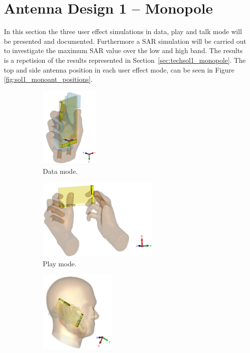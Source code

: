 \section{Antenna Design 1 -- Monopole}
In this section the three user effect simulations in data, play and talk mode will be presented and documented. Furthermore a SAR simulation will be carried out to investigate the maximum SAR value over the low and high band. The results is a repetision of the results represented in Section~\ref{sec:techsol1_monopole}.    
The top and side antenna position in each user effect mode, can be seen in Figure \ref{fig:sol1_monoant_positions}.


\begin{figure}[htbp]
    \centering
    \begin{subfigure}[b]{0.24\linewidth}
        \centering \includegraphics[width=\linewidth,height=4cm,keepaspectratio]{img/tech_sol/monopole/data_mode/3d_data_mode.PNG}
        \caption{Data mode.}
    \end{subfigure}
    \begin{subfigure}[b]{0.24\linewidth}
        \centering \includegraphics[width=\linewidth,height=4cm,keepaspectratio]{img/tech_sol/monopole/play_mode/3d_play_mode.PNG}
        \caption{Play mode.}
    \end{subfigure}
    \begin{subfigure}[b]{0.24\linewidth}
        \centering \includegraphics[width=\linewidth,height=4cm,keepaspectratio]{img/tech_sol/monopole/talk_mode/3d_talk_mode.PNG}

\end{subfigure}
\end{figure}
